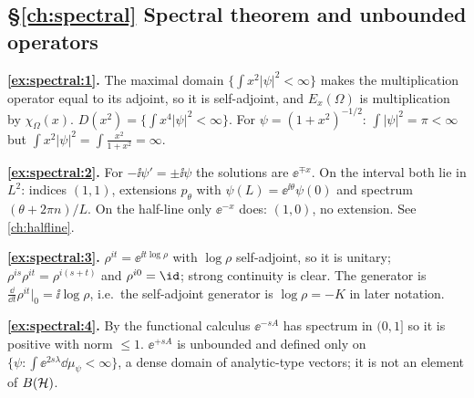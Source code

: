 {\subsection*{\S\ref{ch:spectral} Spectral theorem and unbounded operators}
\textbf{\ref{ex:spectral:1}.} The maximal domain $\{\int x^2|\psi|^2<\infty\}$ makes the multiplication operator equal to its adjoint, so it is self-adjoint, and $E_x(\Omega)$ is multiplication by $\chi_\Omega(x)$. $D(x^2)=\{\int x^4|\psi|^2<\infty\}$. For $\psi=(1+x^2)^{-1/2}$: $\int|\psi|^2=\pi<\infty$ but $\int x^2|\psi|^2=\int\frac{x^2}{1+x^2}=\infty$.\par
\textbf{\ref{ex:spectral:2}.} For $-\ii\psi'=\pm\ii\psi$ the solutions are $\ee^{\mp x}$. On the interval both lie in $L^2$: indices $(1,1)$, extensions $p_\theta$ with $\psi(L)=\ee^{\ii\theta}\psi(0)$ and spectrum $(\theta+2\pi n)/L$. On the half-line only $\ee^{-x}$ does: $(1,0)$, no extension. See \cref{ch:halfline}.\par
\textbf{\ref{ex:spectral:3}.} $\rho^{it}=\ee^{\ii t\log\rho}$ with $\log\rho$ self-adjoint, so it is unitary; $\rho^{is}\rho^{it}=\rho^{i(s+t)}$ and $\rho^{i0}=\id$; strong continuity is clear. The generator is $\frac{\dd}{\dd t}\rho^{it}|_0=\ii\log\rho$, i.e.\ the self-adjoint generator is $\log\rho=-K$ in later notation.\par
\textbf{\ref{ex:spectral:4}.} By the functional calculus $\ee^{-sA}$ has spectrum in $(0,1]$ so it is positive with norm $\le1$. $\ee^{+sA}$ is unbounded and defined only on $\{\psi:\int\ee^{2s\lambda}\dd\mu_\psi<\infty\}$, a dense domain of analytic-type vectors; it is not an element of $B(\mathcal{H})$.\par

}
